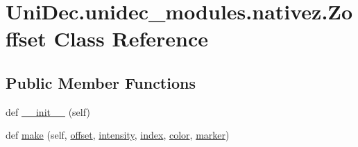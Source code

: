 \hypertarget{class_uni_dec_1_1unidec__modules_1_1nativez_1_1_zoffset}{}\section{Uni\+Dec.\+unidec\+\_\+modules.\+nativez.\+Zoffset Class Reference}
\label{class_uni_dec_1_1unidec__modules_1_1nativez_1_1_zoffset}
\subsection*{Public Member Functions}
\begin{DoxyCompactItemize}
\item 
def \hyperlink{class_uni_dec_1_1unidec__modules_1_1nativez_1_1_zoffset_a01cadcc3a370875587f72b21be8307c0}{\+\_\+\+\_\+init\+\_\+\+\_\+} (self)
\item 
def \hyperlink{class_uni_dec_1_1unidec__modules_1_1nativez_1_1_zoffset_a793a97f258984b747ac8ed7607bcb298}{make} (self, \hyperlink{class_uni_dec_1_1unidec__modules_1_1nativez_1_1_zoffset_a9b1e6480531d69e340c5db96ed14fbf5}{offset}, \hyperlink{class_uni_dec_1_1unidec__modules_1_1nativez_1_1_zoffset_a02aad0da32cc8d3ec5d22b99cbb5cc01}{intensity}, \hyperlink{class_uni_dec_1_1unidec__modules_1_1nativez_1_1_zoffset_a58bc2d000e3867c54b63ba0ad2b78faa}{index}, \hyperlink{class_uni_dec_1_1unidec__modules_1_1nativez_1_1_zoffset_a457f79df370d2dc7327ac490387b7a75}{color}, \hyperlink{class_uni_dec_1_1unidec__modules_1_1nativez_1_1_zoffset_a5c3608e4a0b75cb87244d5dba45587e5}{marker})
\end{DoxyCompactItemize}
